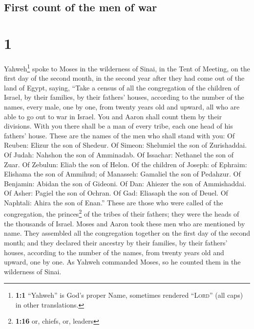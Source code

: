 \hypertarget{first-count-of-the-men-of-war}{%
\subsection{First count of the men of
war}\label{first-count-of-the-men-of-war}}

\hypertarget{section}{%
\section{1}\label{section}}

 Yahweh\footnote{\textbf{1:1} ``Yahweh'' is God's proper
  Name, sometimes rendered ``\textsc{Lord}'' (all caps) in other
  translations.} spoke to Moses in the wilderness of Sinai, in the Tent
of Meeting, on the first day of the second month, in the second year
after they had come out of the land of Egypt, saying, 
``Take a census of all the congregation of the children of Israel, by
their families, by their fathers' houses, according to the number of the
names, every male, one by one,  from twenty years old and
upward, all who are able to go out to war in Israel. You and Aaron shall
count them by their divisions.  With you there shall be a
man of every tribe, each one head of his fathers' house. 
These are the names of the men who shall stand with you: Of Reuben:
Elizur the son of Shedeur.  Of Simeon: Shelumiel the son
of Zurishaddai.  Of Judah: Nahshon the son of Amminadab.
 Of Issachar: Nethanel the son of Zuar.  Of
Zebulun: Eliab the son of Helon.  Of the children of
Joseph: of Ephraim: Elishama the son of Ammihud; of Manasseh: Gamaliel
the son of Pedahzur.  Of Benjamin: Abidan the son of
Gideoni.  Of Dan: Ahiezer the son of Ammishaddai.
 Of Asher: Pagiel the son of Ochran.  Of
Gad: Eliasaph the son of Deuel.  Of Naphtali: Ahira the
son of Enan.''  These are those who were called of the
congregation, the princes\footnote{\textbf{1:16} or, chiefs, or, leaders}
of the tribes of their fathers; they were the heads of the thousands of
Israel.  Moses and Aaron took these men who are mentioned
by name.  They assembled all the congregation together on
the first day of the second month; and they declared their ancestry by
their families, by their fathers' houses, according to the number of the
names, from twenty years old and upward, one by one.  As
Yahweh commanded Moses, so he counted them in the wilderness of Sinai.

